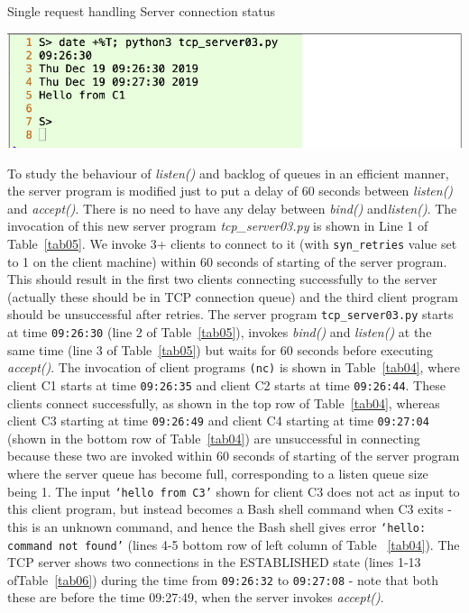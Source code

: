 \begin{table}[H]
\centering

\vspace{-.8cm}

\caption{Single request handling Server connection status}\label{tab05}
\smallskip
\includegraphics[scale=2.35]{src/Figures/chap1/tab05.jpg}
\end{table}

\begin{multicols}{2}
To study the behaviour of \textit{listen()} and backlog of queues in an efficient manner, the server program is modified just to put a delay of 60 seconds between \textit{listen()} and \textit{accept()}. There is no need to have any delay between \textit{bind()} and\textit{listen()}. The invocation of this new server program \textit{tcp\_server03.py} is shown in Line 1 of Table~\ref{tab05}. We invoke 3+ clients to connect to it (with \texttt{syn\_retries} value set to 1 on the client machine) within 60 seconds of starting of the server program. This should result in the first two clients connecting successfully to the server (actually these should be in TCP connection queue) and the third client program should be unsuccessful after retries. The server program \texttt{tcp\_server03.py} \cite{art1-key17} starts at time \texttt{09:26:30} (line 2 of Table~\ref{tab05}), invokes \textit{bind()} and \textit{listen()} at the same time (line 3 of Table~\ref{tab05}) but waits for 60 seconds before executing \textit{accept()}. The invocation of client programs \texttt{(nc)} is shown in Table~\ref{tab04}, where client C1 starts at time \texttt{09:26:35} and client C2 starts at time \texttt{09:26:44}. These clients connect successfully, as shown in the top row of Table~\ref{tab04}, whereas client C3 starting at time \texttt{09:26:49} and client C4 starting at time \texttt{09:27:04} (shown in the bottom row of Table~\ref{tab04}) are unsuccessful in connecting because these two are invoked within 60 seconds of starting of the server program where the server queue has become full, corresponding to a listen queue size being 1. The input \texttt{‘hello from C3’} shown for client C3 does not act as input to this client program, but instead becomes a Bash shell command when C3 exits - this is an unknown command, and hence the Bash shell gives error \texttt{‘hello: command not found’} (lines 4-5 bottom row of left column of Table ~\ref{tab04}). The TCP server shows two connections in the ESTABLISHED state (lines 1-13 of\break Table~\ref{tab06}) during the time from \texttt{09:26:32} to \texttt{09:27:08} - note that both these are before the time 09:27:49, when the server invokes \textit{accept()}.
\end{multicols}

